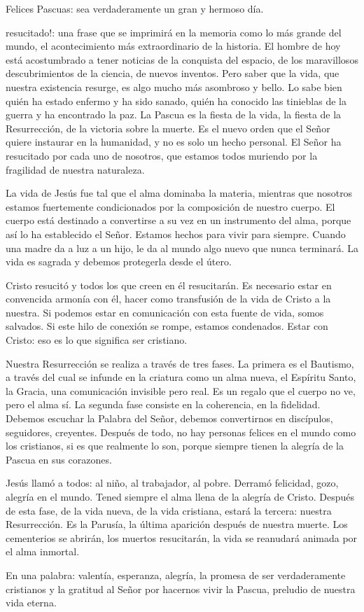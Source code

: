 \begin{body}
[\ldots] Felices Pascuas: sea verdaderamente un gran y hermoso día. 

 resucitado!: una frase que se imprimirá en la memoria como lo más grande del mundo, el acontecimiento más extraordinario de la historia. El hombre de hoy está acostumbrado a tener noticias de la conquista del espacio, de los maravillosos descubrimientos de la ciencia, de nuevos inventos. Pero saber que la vida, que nuestra existencia resurge, es algo mucho más asombroso y bello. Lo sabe bien quién ha estado enfermo y ha sido sanado, quién ha conocido las tinieblas de la guerra y ha encontrado la paz. La Pascua es la fiesta de la vida, la fiesta de la Resurrección, de la victoria sobre la muerte. Es el nuevo orden que el Señor quiere instaurar en la humanidad, y no es solo un hecho personal. El Señor ha resucitado por cada uno de nosotros, que estamos todos muriendo por la fragilidad de nuestra naturaleza. 

La vida de Jesús fue tal que el alma dominaba la materia, mientras que nosotros estamos fuertemente condicionados por la composición de nuestro cuerpo. El cuerpo está destinado a convertirse a su vez en un instrumento del alma, porque así lo ha establecido el Señor. Estamos hechos para vivir para siempre. Cuando una madre da a luz a un hijo, le da al mundo algo nuevo que nunca terminará. La vida es sagrada y debemos protegerla desde el útero. 

Cristo resucitó y todos los que creen en él resucitarán. Es necesario estar en convencida armonía con él, hacer como transfusión de la vida de Cristo a la nuestra. Si podemos estar en comunicación con esta fuente de vida, somos salvados. Si este hilo de conexión se rompe, estamos condenados. Estar con Cristo: eso es lo que significa ser cristiano. 

Nuestra Resurrección se realiza a través de tres fases. La primera es el Bautismo, a través del cual se infunde en la criatura como un alma nueva, el Espíritu Santo, la Gracia, una comunicación invisible pero real. Es un regalo que el cuerpo no ve, pero el alma sí. La segunda fase consiste en la coherencia, en la fidelidad. Debemos escuchar la Palabra del Señor, debemos convertirnos en discípulos, seguidores, creyentes. Después de todo, no hay personas felices en el mundo como los cristianos, si es que realmente lo son, porque siempre tienen la alegría de la Pascua en sus corazones. 

Jesús llamó a todos: al niño, al trabajador, al pobre. Derramó felicidad, gozo, alegría en el mundo. Tened siempre el alma llena de la alegría de Cristo. Después de esta fase, de la vida nueva, de la vida cristiana, estará la tercera: nuestra Resurrección. Es la Parusía, la última aparición después de nuestra muerte. Los cementerios se abrirán, los muertos resucitarán, la vida se reanudará animada por el alma inmortal. 

En una palabra: valentía, esperanza, alegría, la promesa de ser verdaderamente cristianos y la gratitud al Señor por hacernos vivir la Pascua, preludio de nuestra vida eterna.
\end{body}

